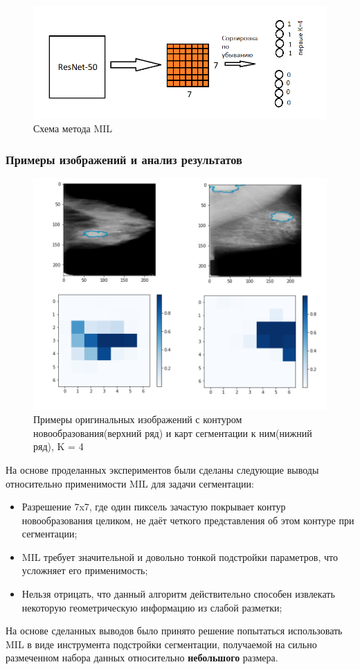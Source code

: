 \begin{figure}[h] 
  \center
  \includegraphics [scale=0.8] {images/schema_mil.png}
  \caption{Схема метода MIL} 
  \label{fig:sexample_mil}  
\end{figure}

\subsubsection{Примеры изображений и анализ результатов}


\begin{figure}[h] 
  \center
  \includegraphics [scale=0.6] {images/mil.png}
  \caption{Примеры оригинальных изображений с контуром новообразования(верхний ряд) и карт сегментации к ним(нижний ряд), K = 4} 
  \label{fig:schema_mil}  
\end{figure}


На основе проделанных экспериментов были сделаны следующие выводы относительно применимости MIL для задачи сегментации:

\begin{itemize}
    \item Разрешение 7x7, где один пиксель зачастую покрывает контур новообразования целиком, не даёт четкого представления об этом контуре при сегментации;
    \item MIL требует значительной и довольно тонкой подстройки параметров, что усложняет его применимость;
    \item Нельзя отрицать, что данный алгоритм действительно способен извлекать некоторую геометрическую информацию из слабой разметки;
\end{itemize}


На основе сделанных выводов было принято решение попытаться использовать MIL в виде инструмента подстройки сегментации, получаемой на сильно размеченном набора данных относительно {\bf небольшого} размера.

